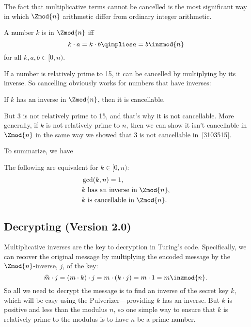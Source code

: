 The fact that multiplicative terms cannot be cancelled is the most
significant way in which $\Zmod{n}$ arithmetic differ from ordinary
integer arithmetic.

\begin{definition}
A number $k$ is  in $\Zmod{n}$ iff
\[
k \cdot a = k \cdot b  \qimplies a = b  \inzmod{n}
\]
for all $k,a,b \in [0,n)$.
\end{definition}

If a number is relatively prime to 15, it can be cancelled by
multiplying by its inverse.  So cancelling obviously works for numbers
that have inverses:
\begin{lemma}\label{lem:cancellation-arb}
If $k$ has an inverse in $\Zmod{n}$, then it is cancellable.
\end{lemma}

But 3 is not relatively prime to 15, and that's why it is not
cancellable.  More generally, if $k$ is not relatively prime to $n$,
then we can show it isn't cancellable in $\Zmod{n}$ in the same way we
showed that 3 is not cancellable in~\eqref{3103515}.

\iffalse
Namely, suppose $\gcd(k,n) = m > 1$.  So $k/m$ and $n/m$ are
positive integers, and we have
\begin{align*}
          (n/m) \cdot k & = n \cdot (k/m),\\
\rem{(n/m) \cdot k}{n} & = \rem{n \cdot (k/m)}{n},\\
        (n/m) \cdot k & = 0 = 0 \cdot k \inzmod{n}.
\end{align*}
Now $k$ can't be cancelled or we would reach the false conclusion that
$n/m = 0$.
\fi

To summarize, we have
\begin{theorem}\label{thm:mod_inverses}
The following are equivalent for $k \in [0,n)$:
\begin{align*}
& \gcd(k, n) = 1,\\
& k \text{ has an inverse in $\Zmod{n}$},\\
& k \text{ is cancellable in $\Zmod{n}$}.
\end{align*}
\end{theorem}

\subsection{Decrypting (Version 2.0)}

Multiplicative inverses are the key to decryption in Turing's code.
Specifically, we can recover the original message by multiplying the
encoded message by the $\Zmod{n}$-inverse, $j$, of the key:
\[
\widehat{m} \cdot j = (m \cdot k) \cdot j = m \cdot (k \cdot j) = m \cdot 1 = m \inzmod{n}.
\]
So all we need to decrypt the message is to find an inverse of the
secret key $k$, which will be easy using the Pulverizer---providing
$k$ has an inverse.  But $k$ is positive and less than the modulus
$n$, so one simple way to ensure that $k$ is relatively prime to the
modulus is to have $n$ be a prime number.


